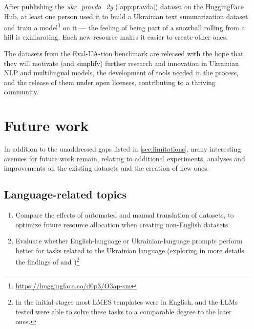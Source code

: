 After publishing the \textit{ukr\_pravda\_2y} (\autoref{app:pravda}) dataset on the HuggingFace Hub, at least one person used it to build a Ukrainian text summarization dataset and train a model\footnote{
\href{https://huggingface.co/d0p3/O3ap-sm}{https://huggingface.co/d0p3/O3ap-sm} 
}
on it  — the feeling of being part of a snowball rolling from a hill is exhilarating. Each new resource makes it easier to create other ones.

The datasets from the Eval-UA-tion benchmark are released with the hope that they will motivate (and simplify) further research and innovation in Ukrainian NLP and multilingual models, the development of tools needed in the process, and the release of them under open licenses, contributing to a thriving community.

\section{Future work}
In addition to the unaddressed gaps listed in \autoref{sec:limitations}, many interesting avenues for future work remain, relating to additional experiments, analyses and improvements on the existing datasets and the creation of new ones.

\subsection{Language-related topics}
\begin{enumerate}
    \tightlist
    \item Compare the effects of automated and manual translation of datasets, to optimize future resource allocation when creating non-English datasets
    \item Evaluate whether English-language or Ukrainian-language prompts perform better for tasks related to the Ukrainian language (exploring in more details the findings of \cite{lai_chatgpt_2023} and \cite{sherlock})\footnote{In the initial stages most LMES templates were in English, and the LLMs tested were able to solve these tasks to a comparable degree to the later ones.}
\end{enumerate}

